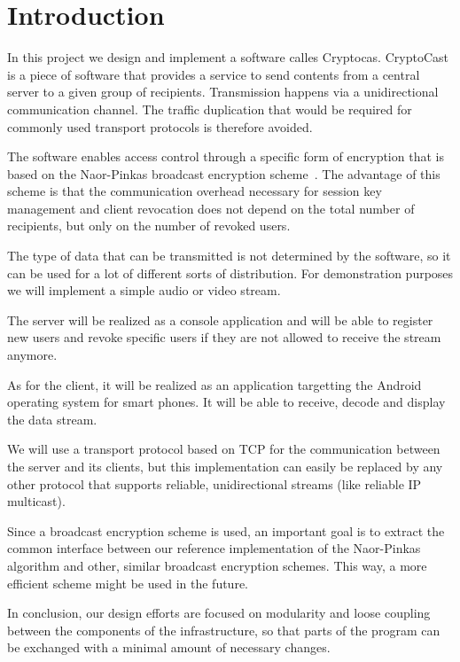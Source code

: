 \documentclass[a4paper,10pt]{scrartcl}
\title{\doctitle}
\author{\authorName}
\date{\today}
\begin{document}

\tableofcontents
\clearpage

\section{Introduction}
In this project we design and implement a software calles Cryptocas. CryptoCast is a piece of software that provides a service to
send contents from a central server to a given group of recipients. Transmission happens via a unidirectional communication channel.
The traffic duplication that would be required for commonly used transport protocols is therefore avoided.

The software enables access control through a specific form of encryption that is based on the Naor-Pinkas broadcast
encryption scheme~\cite[Section~2.2]{Naor00}. The advantage of this scheme is that the communication overhead necessary for session key
management and client revocation does not depend on the total number of recipients, but only on the
number of revoked users.

The type of data that can be transmitted is not determined by the software, so it can be used for a lot
of different sorts of distribution. For demonstration purposes we will implement a simple audio or video
stream.

The server will be realized as a console application and will be able to register new users and revoke
specific users if they are not allowed to receive the stream anymore.

As for the client, it will be realized as an application targetting the Android operating system for smart phones.
It will be able to receive, decode and display the data stream.

We will use a transport protocol based on TCP for the communication between the server and its clients,
but this implementation can easily be replaced by any other protocol that supports reliable, unidirectional
streams (like reliable IP multicast).

Since a broadcast encryption scheme is used, an important goal is to extract the common interface between our
reference implementation of the Naor-Pinkas algorithm and other, similar broadcast encryption schemes.
This way, a more efficient scheme might be used in the future.

In conclusion, our design efforts are focused on modularity and loose coupling between the components of the
infrastructure, so that parts of the program can be exchanged with a minimal amount of necessary changes.
\end{document}
